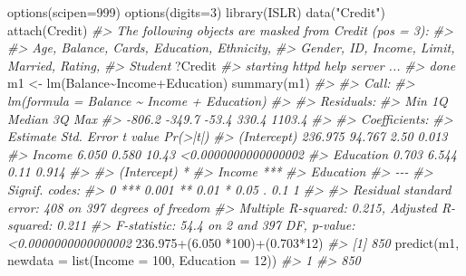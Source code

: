\documentclass[
]{book}
\newenvironment{Shaded}{\begin{snugshade}}{\end{snugshade}}
\newcommand{\AttributeTok}[1]{\textcolor[rgb]{0.77,0.63,0.00}{#1}}
\newcommand{\CommentTok}[1]{\textcolor[rgb]{0.56,0.35,0.01}{\textit{#1}}}
\newcommand{\DecValTok}[1]{\textcolor[rgb]{0.00,0.00,0.81}{#1}}
\newcommand{\FloatTok}[1]{\textcolor[rgb]{0.00,0.00,0.81}{#1}}
\newcommand{\FunctionTok}[1]{\textcolor[rgb]{0.00,0.00,0.00}{#1}}
\newcommand{\NormalTok}[1]{#1}
\newcommand{\OtherTok}[1]{\textcolor[rgb]{0.56,0.35,0.01}{#1}}
\newcommand{\SpecialCharTok}[1]{\textcolor[rgb]{0.00,0.00,0.00}{#1}}
\newcommand{\StringTok}[1]{\textcolor[rgb]{0.31,0.60,0.02}{#1}}
\begin{document}
\begin{Shaded}
\begin{Highlighting}[]
\FunctionTok{options}\NormalTok{(}\AttributeTok{scipen=}\DecValTok{999}\NormalTok{)}
\FunctionTok{options}\NormalTok{(}\AttributeTok{digits=}\DecValTok{3}\NormalTok{)}
\FunctionTok{library}\NormalTok{(ISLR)}
\FunctionTok{data}\NormalTok{(}\StringTok{"Credit"}\NormalTok{)}
\FunctionTok{attach}\NormalTok{(Credit)}
\CommentTok{\#\textgreater{} The following objects are masked from Credit (pos = 3):}
\CommentTok{\#\textgreater{} }
\CommentTok{\#\textgreater{}     Age, Balance, Cards, Education, Ethnicity,}
\CommentTok{\#\textgreater{}     Gender, ID, Income, Limit, Married, Rating,}
\CommentTok{\#\textgreater{}     Student}
\NormalTok{?Credit}
\CommentTok{\#\textgreater{} starting httpd help server ...}
\CommentTok{\#\textgreater{}  done}
\NormalTok{m1 }\OtherTok{\textless{}{-}} \FunctionTok{lm}\NormalTok{(Balance}\SpecialCharTok{\textasciitilde{}}\NormalTok{Income}\SpecialCharTok{+}\NormalTok{Education)}
\FunctionTok{summary}\NormalTok{(m1)}
\CommentTok{\#\textgreater{} }
\CommentTok{\#\textgreater{} Call:}
\CommentTok{\#\textgreater{} lm(formula = Balance \textasciitilde{} Income + Education)}
\CommentTok{\#\textgreater{} }
\CommentTok{\#\textgreater{} Residuals:}
\CommentTok{\#\textgreater{}    Min     1Q Median     3Q    Max }
\CommentTok{\#\textgreater{} {-}806.2 {-}349.7  {-}53.4  330.4 1103.4 }
\CommentTok{\#\textgreater{} }
\CommentTok{\#\textgreater{} Coefficients:}
\CommentTok{\#\textgreater{}             Estimate Std. Error t value            Pr(\textgreater{}|t|)}
\CommentTok{\#\textgreater{} (Intercept)  236.975     94.767    2.50               0.013}
\CommentTok{\#\textgreater{} Income         6.050      0.580   10.43 \textless{}0.0000000000000002}
\CommentTok{\#\textgreater{} Education      0.703      6.544    0.11               0.914}
\CommentTok{\#\textgreater{}                }
\CommentTok{\#\textgreater{} (Intercept) *  }
\CommentTok{\#\textgreater{} Income      ***}
\CommentTok{\#\textgreater{} Education      }
\CommentTok{\#\textgreater{} {-}{-}{-}}
\CommentTok{\#\textgreater{} Signif. codes:  }
\CommentTok{\#\textgreater{} 0 \textquotesingle{}***\textquotesingle{} 0.001 \textquotesingle{}**\textquotesingle{} 0.01 \textquotesingle{}*\textquotesingle{} 0.05 \textquotesingle{}.\textquotesingle{} 0.1 \textquotesingle{} \textquotesingle{} 1}
\CommentTok{\#\textgreater{} }
\CommentTok{\#\textgreater{} Residual standard error: 408 on 397 degrees of freedom}
\CommentTok{\#\textgreater{} Multiple R{-}squared:  0.215,  Adjusted R{-}squared:  0.211 }
\CommentTok{\#\textgreater{} F{-}statistic: 54.4 on 2 and 397 DF,  p{-}value: \textless{}0.0000000000000002}
\FloatTok{236.975}\SpecialCharTok{+}\NormalTok{(}\FloatTok{6.050} \SpecialCharTok{*}\DecValTok{100}\NormalTok{)}\SpecialCharTok{+}\NormalTok{(}\FloatTok{0.703}\SpecialCharTok{*}\DecValTok{12}\NormalTok{)}
\CommentTok{\#\textgreater{} [1] 850}
\FunctionTok{predict}\NormalTok{(m1, }\AttributeTok{newdata =} \FunctionTok{list}\NormalTok{(}\AttributeTok{Income =} \DecValTok{100}\NormalTok{, }\AttributeTok{Education =} \DecValTok{12}\NormalTok{))}
\CommentTok{\#\textgreater{}   1 }
\CommentTok{\#\textgreater{} 850}


\end{Highlighting}
\end{Shaded}
\end{document}
